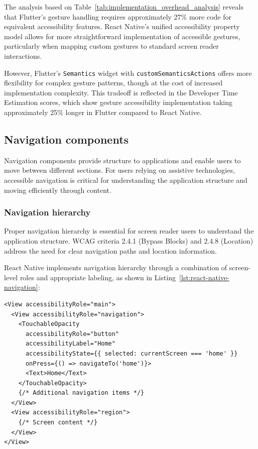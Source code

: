 \pagebreak

The analysis based on Table~\ref{tab:implementation_overhead_analysis} reveals that Flutter's gesture handling requires approximately 27\% more code for equivalent accessibility features. React Native's unified accessibility property model allows for more straightforward implementation of accessible gestures, particularly when mapping custom gestures to standard screen reader interactions.

However, Flutter's \texttt{Semantics} widget with \texttt{customSemanticsActions} offers more flexibility for complex gesture patterns, though at the cost of increased implementation complexity. This tradeoff is reflected in the Developer Time Estimation scores, which show gesture accessibility implementation taking approximately 25\% longer in Flutter compared to React Native.

\subsection{Navigation components}
\label{subsec:navigation-components}

Navigation components provide structure to applications and enable users to move between different sections. For users relying on assistive technologies, accessible navigation is critical for understanding the application structure and moving efficiently through content.

\subsubsection{Navigation hierarchy}
\label{subsubsec:navigation-hierarchy}

Proper navigation hierarchy is essential for screen reader users to understand the application structure. WCAG criteria 2.4.1 (Bypass Blocks) and 2.4.8 (Location) address the need for clear navigation paths and location information.

React Native implements navigation hierarchy through a combination of screen-level roles and appropriate labeling, as shown in Listing~\ref{lst:react-native-navigation}:

\begin{lstlisting}[style=ReactNativeStyle, caption=Navigation hierarchy in React Native, label=lst:react-native-navigation]
<View accessibilityRole="main">
  <View accessibilityRole="navigation">
    <TouchableOpacity
      accessibilityRole="button"
      accessibilityLabel="Home"
      accessibilityState={{ selected: currentScreen === 'home' }}
      onPress={() => navigateTo('home')}>
      <Text>Home</Text>
    </TouchableOpacity>
    {/* Additional navigation items */}
  </View>
  <View accessibilityRole="region">
    {/* Screen content */}
  </View>
</View>
\end{lstlisting}

